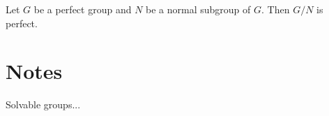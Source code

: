\begin{prob}
Let $G$ be a perfect group and $N$ be a normal subgroup of $G$. Then $G/N$ is perfect.  	
\end{prob}


\section*{Notes}

Solvable groups...



